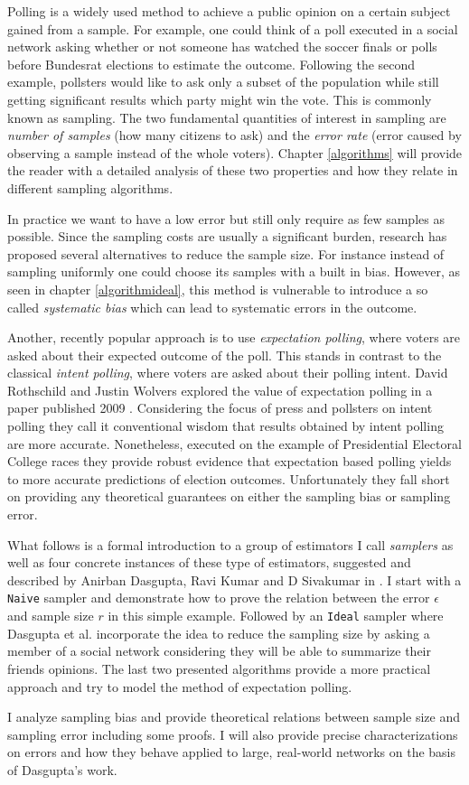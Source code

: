 Polling is a widely used method to achieve a public opinion on a certain subject gained from a sample. For example, one could think of a poll executed in a social network asking whether or not someone has watched the soccer finals or polls before Bundesrat elections to estimate the outcome.
Following the second example, pollsters would like to ask only a subset of the population while still getting significant results which party might win the vote. This is commonly known as sampling.
The two fundamental quantities of interest in sampling are \textit{number of samples} (how many citizens to ask) and the \textit{error rate} (error caused by observing a sample instead of the whole voters). Chapter \ref{algorithms} will provide the reader with a detailed analysis of these two properties and how they relate in different sampling algorithms.

In practice we want to have a low error but still only require as few samples as possible.
Since the sampling costs are usually a significant burden, research has proposed several alternatives to reduce the sample size.
For instance instead of sampling uniformly one could choose its samples with a built in bias.
However, as seen in chapter \ref{algorithmideal}, this method is vulnerable to introduce a so called \textit{systematic bias} which can lead to systematic errors in the outcome.

Another, recently popular approach is to use \textit{expectation polling}, where voters are asked about their expected outcome of the poll. This stands in contrast to the classical \textit{intent polling}, where voters are asked about their polling intent. David Rothschild and Justin Wolvers explored the value of expectation polling in a paper published 2009 \cite{rothschild2009forecasting}. Considering the focus of press and pollsters on intent polling they call it conventional wisdom that results obtained by intent polling are more accurate. Nonetheless, executed on the example of Presidential Electoral College races they provide robust evidence that expectation based polling yields to more accurate predictions of election outcomes.
Unfortunately they fall short on providing any theoretical guarantees on either the sampling bias or sampling error.

What follows is a formal introduction to a group of estimators I call \textit{samplers} as well as four concrete instances of these type of estimators, suggested and described by Anirban Dasgupta, Ravi Kumar and D Sivakumar in \cite{dasgupta2012social}.
I start with a \texttt{Naive} sampler and demonstrate how to prove the relation between the error $\epsilon$ and sample size $r$ in this simple example. Followed by an \texttt{Ideal} sampler where Dasgupta et al. incorporate the idea to reduce the sampling size by asking a member of a social network considering they will be able to summarize their friends opinions.
The last two presented algorithms provide a more practical approach and try to model the method of expectation polling.

I analyze sampling bias and provide theoretical relations between sample size and sampling error including some proofs.
I will also provide precise characterizations on errors and how they behave applied to large, real-world networks on the basis of Dasgupta's work.
